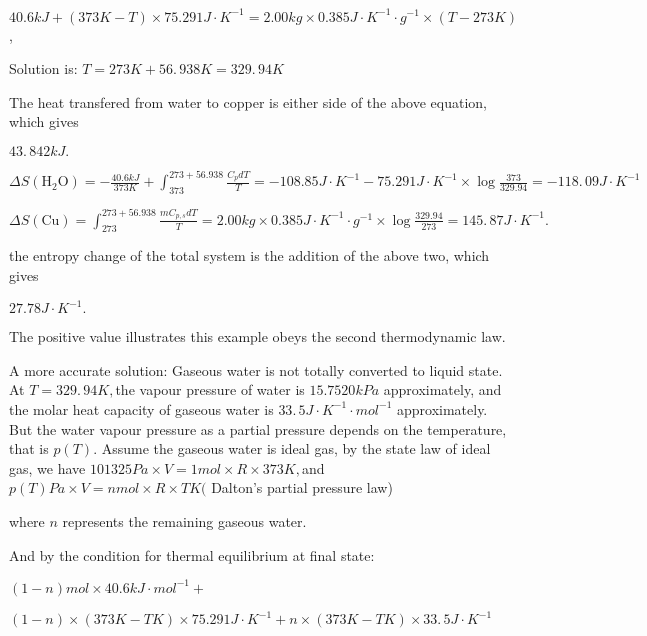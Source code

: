 \documentclass{ctexart}
\begin{document}
$40.6\unit{kJ}+\left( 373\unit{K}-T\right) \times 75.291\unit{J}\cdot \unit{K%
}^{-1}=2.00\unit{kg}\times 0.385\unit{J}\cdot \unit{K}^{-1}\cdot \unit{g}%
^{-1}\times \left( T-273\unit{K}\right) $,

Solution is: $T=273\unit{K}+56.\,\allowbreak 938\unit{K}=\allowbreak
329.\,\allowbreak 94\unit{K}$

The heat transfered from water to copper is either side of the above
equation, which gives

$\allowbreak 43.\,\allowbreak 842\unit{kJ}.$

$\Delta S\left( \text{H}_{2}\text{O}\right) =-\frac{40.6\unit{kJ}}{373\unit{K%
}}+\int_{373}^{273+56.938}\frac{C_{p}dT}{T}=-108.85\unit{J}\cdot \unit{K}%
^{-1}-75.291\unit{J}\cdot \unit{K}^{-1}\times \log \frac{373}{329.94}%
=\allowbreak -118.\,\allowbreak 09\unit{J}\cdot \unit{K}^{-1}$

$\Delta S\left( \text{Cu}\right) =\int_{273}^{273+56.938}\frac{mC_{p,s}dT}{T}%
=2.00\unit{kg}\times 0.385\unit{J}\cdot \unit{K}^{-1}\cdot \unit{g}%
^{-1}\times \log \frac{329.94}{273}=145.\,87\unit{J}\cdot \unit{K}^{-1}.$

the entropy change of the total system is the addition of the above two,
which gives

$27.78\unit{J}\cdot \unit{K}^{-1}.$

The positive value illustrates this example obeys the second thermodynamic
law.

\bigskip A more accurate solution: Gaseous water is not totally converted to
liquid state. At $T=\allowbreak 329.\,\allowbreak 94K,$the vapour pressure
of water is $15.7520\unit{kPa}$ approximately, and the molar heat capacity
of gaseous water is $\allowbreak 33.\,\allowbreak 5\unit{J}\cdot \unit{K}%
^{-1}\cdot \unit{mol}^{-1}$ approximately. But the water vapour pressure as
a partial pressure depends on the temperature, that is $p\left( T\right) .$%
Assume the gaseous water is ideal gas, by the state law of ideal gas, we
have $101325\unit{Pa}\times V=1\unit{mol}\times R\times 373\unit{K},$and $%
p\left( T\right) \unit{Pa}\times V=n\unit{mol}\times R\times T\unit{K}($%
Dalton's partial pressure law)

where $n$ represents the remaining gaseous water.

And by the condition for thermal equilibrium at final state:

$\left( 1-n\right) \unit{mol}\times 40.6\unit{kJ}\cdot \unit{mol}^{-1}+$

$\left( 1-n\right) \times \left( 373\unit{K}-T\unit{K}\right) \times 75.291%
\unit{J}\cdot \unit{K}^{-1}+n\times \left( 373\unit{K}-T\unit{K}\right)
\times \allowbreak 33.\,\allowbreak 5\unit{J}\cdot \unit{K}^{-1}$
\end{document}
